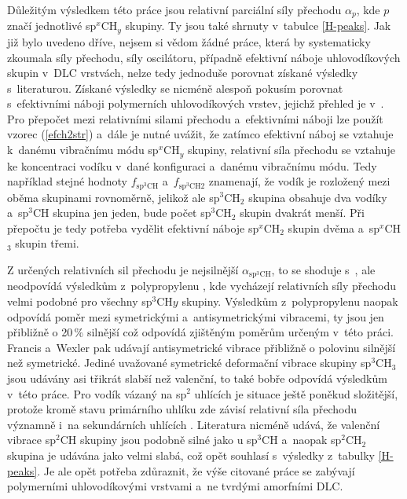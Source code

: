 Důležitým výsledkem této práce jsou relativní parciální síly přechodu $\alpha_p$, kde $p$ značí jednotlivé sp$^x$CH$_y$ skupiny. Ty jsou také shrnuty v~tabulce \ref{H-peaks}. Jak již bylo uvedeno dříve, nejsem si vědom žádné práce, která by systematicky zkoumala síly přechodu, síly oscilátoru, případně efektivní náboje uhlovodíkových skupin v~DLC vrstvách, nelze tedy jednoduše porovnat získané výsledky s~literaturou. 
Získané výsledky se nicméně alespoň pokusím porovnat s~efektivními náboji polymerních uhlovodíkových vrstev, jejichž přehled je v~\cite{Heitz1998}. Pro přepočet mezi relativními silami přechodu a~efektivními náboji lze použít vzorec (\ref{efch2str}) a~dále je nutné uvážit, že zatímco efektivní náboj se vztahuje k~danému vibračnímu módu sp$^x$CH$_y$ skupiny, relativní síla přechodu se vztahuje ke koncentraci vodíku v~dané konfiguraci a~danému vibračnímu módu. 
Tedy například stejné hodnoty $f_\mathrm{sp^3CH}$ a~$f_\mathrm{sp^3CH2}$ znamenají, že vodík je rozložený mezi oběma skupinami rovnoměrně, jelikož ale sp$^3$CH$_2$ skupina obsahuje dva vodíky a~sp$^3$CH skupina jen jeden, bude počet sp$^3$CH$_2$ skupin dvakrát menší. Při přepočtu je tedy potřeba vydělit efektivní náboje sp$^x$CH$_2$ skupin dvěma a~sp$^x$CH$_3$ skupin třemi. 

Z určených relativních sil přechodu je nejsilnější $\alpha_\mathrm{sp^3CH}$, to se shoduje s~\cite{Francis1950, Wexler1967}, ale neodpovídá výsledkům z~polypropylenu \cite{Heitz1998}, kde vycházejí relativních síly přechodu velmi podobné pro všechny sp$^3$CH$y$ skupiny. Výsledkům z~polypropylenu naopak odpovídá poměr mezi symetrickými a~antisymetrickými vibracemi, ty jsou jen přibližně o 20\,\% silnější což odpovídá zjištěným poměrům určeným v~této práci. Francis \cite{Francis1950} a~Wexler \cite{Wexler1967} pak udávají antisymetrické vibrace přibližně o polovinu silnější než symetrické. Jediné uvažované symetrické deformační vibrace skupiny sp$^3$CH$_3$ jsou udávány asi třikrát slabší než valenční, to také bobře odpovídá výsledkům v~této práce.  
Pro vodík vázaný na sp$^2$ uhlících je situace ještě poněkud složitější, protože kromě stavu primárního uhlíku zde závisí relativní síla přechodu významně i~na sekundárních uhlících \cite{Heitz1998}. Literatura nicméně udává, že valenční vibrace sp$^2$CH skupiny jsou podobně silné jako u sp$^3$CH a~naopak sp$^2$CH$_2$ skupina je udávána jako velmi slabá, což opět souhlasí s~výsledky z~tabulky \ref{H-peaks}. Je ale opět potřeba zdůraznit, že výše citované práce se zabývají polymerními uhlovodíkovými vrstvami a~ne tvrdými amorfními DLC.   


